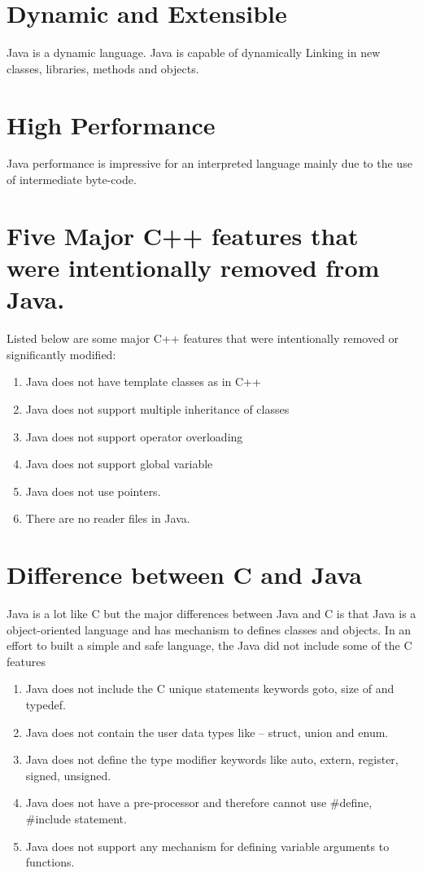 \documentclass[11pt, a4paper]{book}
\begin{document}
    \section{Dynamic and Extensible}
      Java is a dynamic language. Java is capable of dynamically Linking in new classes, libraries, methods and objects.
  
    \section{High Performance}
     Java performance is impressive for an interpreted language mainly due to the use of intermediate byte-code.
  
    \section{Five Major C++ features that were intentionally removed from Java.}
      Listed below are some major C++ features that were intentionally removed or significantly modified:
  
      \begin{enumerate}
  
        \item Java does not have template classes as in C++
        \item Java does not support multiple inheritance of classes
        \item Java does not support operator overloading
        \item Java does not support global variable
        \item Java does not use pointers.
        \item There are no reader files in Java.
  
      \end{enumerate}
  
    \section{Difference between C and Java}
      Java is a lot like C but the major differences between Java and C is that Java is a object-oriented language and has mechanism to defines classes and objects. In an effort to built a simple and safe language, the Java did not include some of the C features
      
      \begin{enumerate}
  
        \item Java does not include the C unique statements keywords goto, size of and typedef.
        \item Java does not contain the user data types like -- struct, union and enum.
        \item Java does not define the type modifier keywords like auto, extern, register, signed, unsigned.
        \item Java does not have a pre-processor and therefore cannot use \#define, \#include statement.
        \item Java does not support any mechanism for defining variable arguments to functions.
  
      \end{enumerate}
    
\end{document}
